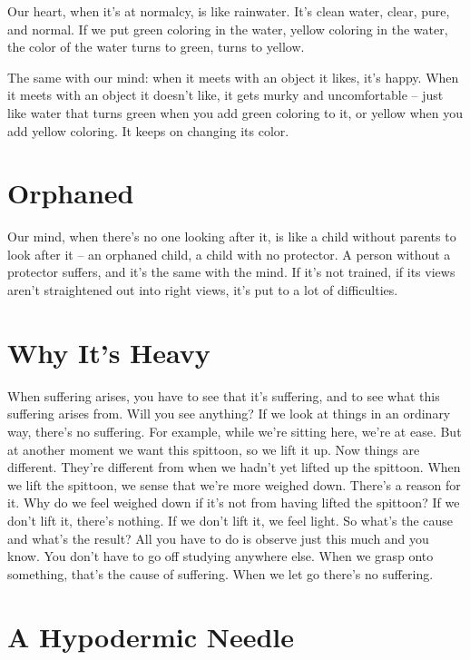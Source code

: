 Our heart, when it's at normalcy, is like rainwater. It's clean water, clear, pure, and normal. If we put green coloring in the water, yellow coloring in the water, the color of the water turns to green, turns to yellow. 

The same with our mind: when it meets with an object it likes, it's happy. When it meets with an object it doesn't like, it gets murky and uncomfortable -- just like water that turns green when you add green coloring to it, or yellow when you add yellow coloring. It keeps on changing its color.

\section{Orphaned}

Our mind, when there's no one looking after it, is like a child without parents to look after it -- an orphaned child, a child with no protector. A person without a protector suffers, and it's the same with the mind. If it's not trained, if its views aren't straightened out into right views, it's put to a lot of difficulties.

\clearpage

\section{Why It's Heavy}

When suffering arises, you have to see that it's suffering, and to see what this suffering arises from. Will you see anything? If we look at things in an ordinary way, there's no suffering. For example, while we're sitting here, we're at ease. But at another moment we want this spittoon, so we lift it up. Now things are different. They're different from when we hadn't yet lifted up the spittoon. When we lift the spittoon, we sense that we're more weighed down. There's a reason for it. Why do we feel weighed down if it's not from having lifted the spittoon? If we don't lift it, there's nothing. If we don't lift it, we feel light. So what's the cause and what's the result? All you have to do is observe just this much and you know. You don't have to go off studying anywhere else. When we grasp onto something, that's the cause of suffering. When we let go there's no suffering.

\clearpage

\section{A Hypodermic Needle}

